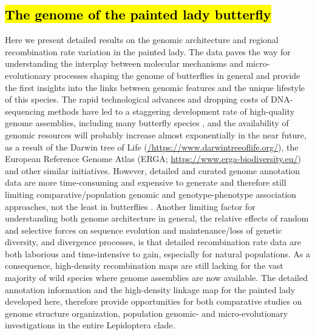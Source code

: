 \documentclass[twocolumn]{bmcart}%
\begin{document}
\subsection*{\hl{The genome of the painted lady butterfly}}
Here we present detailed results on the genomic architecture and regional recombination rate variation in the painted lady. The data paves the way for understanding the interplay between molecular mechanisms and micro-evolutionary processes shaping the genome of butterflies in general and provide the first insights into the links between genomic features and the unique lifestyle of this species. The rapid technological advances and dropping costs of DNA-sequencing methods have led to a staggering development rate of high-quality genome assemblies, including many butterfly species \cite{celorio-manceraChromosomeLevelAssembly2021, guDichotomyDosageCompensation2019, liOutbredGenomeSequencing2015, smolanderImprovedChromosomelevelGenome2022, yangChromosomeLevelReference2020}, and the availability of genomic resources will probably increase almost exponentially in the near future, as a result of the Darwin tree of Life (\href{https://www.darwintreeoflife.org}{/https://www.darwintreeoflife.org/}), the European Reference Genome Atlas (ERGA; \href{https://www.erga-biodiversity.eu/}{https://www.erga-biodiversity.eu/}) and other similar initiatives. However, detailed and curated genome annotation data are more time-consuming and expensive to generate and therefore still limiting comparative/population genomic and genotype-phenotype association approaches, not the least in butterflies \cite{daveyNoEvidenceMaintenance2017, hillUnprecedentedReorganizationHolocentric2019, vanbelleghemComplexModularArchitecture2017}. Another limiting factor for understanding both genome architecture in general, the relative effects of random and selective forces on sequence evolution and maintenance/loss of genetic diversity, and divergence processes, is that detailed recombination rate data are both laborious and time-intensive to gain, especially for natural populations. As a consequence, high-density recombination maps are still lacking for the vast majority of wild species where genome assemblies are now available. The detailed annotation information and the high-density linkage map for the painted lady developed here, therefore provide opportunities for both comparative studies on genome structure organization, population genomic- and micro-evolutionary investigations in the entire Lepidoptera clade.
\end{document}
